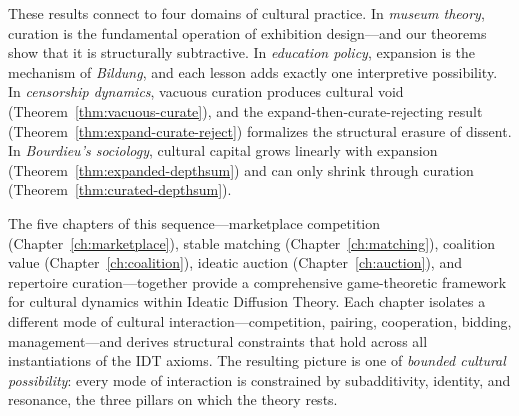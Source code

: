 These results connect to four domains of cultural practice.  In
\emph{museum theory}, curation is the fundamental operation of exhibition
design---and our theorems show that it is structurally subtractive.  In
\emph{education policy}, expansion is the mechanism of \emph{Bildung},
and each lesson adds exactly one interpretive possibility.  In
\emph{censorship dynamics}, vacuous curation produces cultural void
(Theorem~\ref{thm:vacuous-curate}), and the expand-then-curate-rejecting
result (Theorem~\ref{thm:expand-curate-reject}) formalizes the structural
erasure of dissent.  In \emph{Bourdieu's sociology}, cultural capital grows
linearly with expansion (Theorem~\ref{thm:expanded-depthsum}) and can only
shrink through curation (Theorem~\ref{thm:curated-depthsum}).

The five chapters of this sequence---marketplace competition
(Chapter~\ref{ch:marketplace}), stable matching
(Chapter~\ref{ch:matching}), coalition value
(Chapter~\ref{ch:coalition}), ideatic auction
(Chapter~\ref{ch:auction}), and repertoire curation---together provide a
comprehensive game-theoretic framework for cultural dynamics within
Ideatic Diffusion Theory.  Each chapter isolates a different mode of
cultural interaction---competition, pairing, cooperation, bidding,
management---and derives structural constraints that hold across all
instantiations of the IDT axioms.  The resulting picture is one of
\emph{bounded cultural possibility}: every mode of interaction is
constrained by subadditivity, identity, and resonance, the three pillars
on which the theory rests.
